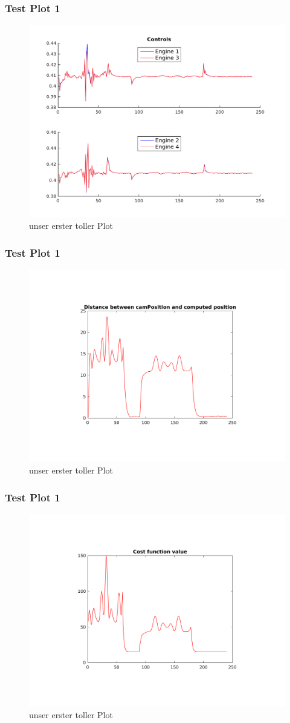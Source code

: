 \begin{frame}
	\frametitle{Test Plot 1}
	\begin{figure}%
	\includegraphics[width=0.75\columnwidth]{images/controls}%
	\caption{unser erster toller Plot}
	\end{figure}
\end{frame}

\begin{frame}
	\frametitle{Test Plot 1}
	\begin{figure}%
	\includegraphics[width=0.75\columnwidth]{images/norm_t_2}%
	\caption{unser erster toller Plot}
	\end{figure}
\end{frame}

\begin{frame}
	\frametitle{Test Plot 1}
	\begin{figure}%
	\includegraphics[width=0.75\columnwidth]{images/costF_2}%
	\caption{unser erster toller Plot}
	\end{figure}
\end{frame}